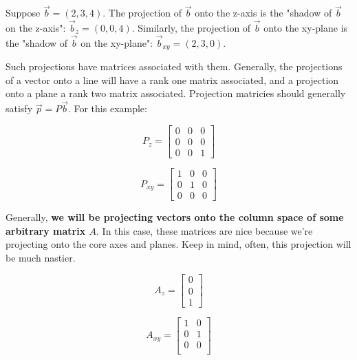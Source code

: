 \documentclass{article}
\begin{document}
\begin{example}
    Suppose $\vec{b} = (2,3,4)$.
    The projection of $\vec{b}$ onto the z-axis is the "shadow of $\vec{b}$ on the z-axis": $\vec{b}_z = (0,0,4)$.
    Similarly, the projection of $\vec{b}$ onto the xy-plane is the "shadow of $\vec{b}$ on the xy-plane": $\vec{b}_{xy} = (2, 3, 0)$.

    Such projections have matrices associated with them.
    Generally, the projections of a vector onto a line will have a rank one matrix associated, and a projection onto a plane a rank two matrix associated.
    Projection matricies should generally satisfy $\vec{p} = P \vec{b}$. For this example:

    \[P_{z} = \begin{bmatrix}
        0& 0& 0\\
        0& 0& 0\\
        0& 0& 1
    \end{bmatrix}\]

    \[P_{xy} = \begin{bmatrix}
        1& 0& 0\\
        0& 1& 0\\
        0& 0& 0
    \end{bmatrix}\]

    Generally, \textbf{we will be projecting vectors onto the column space of some arbitrary matrix $A$}.
    In this case, these matrices are nice because we're projecting onto the core axes and planes.
    Keep in mind, often, this projection will be much nastier.

    \[A_{z} =\begin{bmatrix}
        0\\
        0\\
        1
    \end{bmatrix}\]

    \[A_{xy} = \begin{bmatrix}
        1& 0\\
        0& 1\\
        0& 0\\
    \end{bmatrix}\]

\end{example}

\newpage
\end{document}

